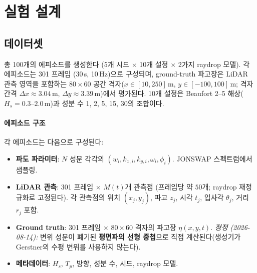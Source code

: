 \documentclass[11pt]{report}
\numberwithin{equation}{chapter}
\numberwithin{figure}{chapter}
\numberwithin{table}{chapter}
\begin{document}
\section{실험 설계}
\label{sec:exp_setup}

\subsection{데이터셋}
\label{sec:dataset}

총 100개의 에피소드를 생성한다
(5개 시드 $\times$ 10개 설정 $\times$ 2가지 raydrop 모델).
각 에피소드는 301 프레임 (30\,s, 10\,Hz)으로 구성되며,
ground-truth 파고장은 LiDAR 관측 영역을 포함하는
$80 \times 60$ 공간 격자($x \in [10, 250]$\,m, $y \in [-100, 100]$\,m;
격자 간격 $\Delta x \approx 3.04$\,m, $\Delta y \approx 3.39$\,m)에서 평가된다.
10개 설정은 Beaufort 2--5 해상($H_s = 0.3$--$2.0$\,m)과
성분 수 1, 2, 5, 15, 30의 조합이다.

\paragraph{에피소드 구조}
각 에피소드는 다음으로 구성된다:
\begin{itemize}
  \item \textbf{파도 파라미터}: $N$ 성분 각각의
        $(w_i, k_{x,i}, k_{y,i}, \omega_i, \phi_i)$. JONSWAP 스펙트럼에서 샘플링.
  \item \textbf{LiDAR 관측}: 301 프레임 $\times$ $M(t)$개 관측점
        (프레임당 약 $50$개; raydrop 재정규화로 고정된다).
        각 관측점의 위치 $(x_j, y_j)$, 파고 $z_j$, 시각 $t_j$,
        입사각 $\theta_j$, 거리 $r_j$ 포함.
  \item \textbf{Ground truth}: 301 프레임 $\times$ $80 \times 60$ 격자의
        파고장 $\eta(x, y, t)$.
        \emph{정정 (2026-08-14):} 변위 성분이 폐기된 \textbf{평면파의 선형 중첩}으로
        직접 계산된다(생성기가 Gerstner의 수평 변위를 사용하지 않는다).
  \item \textbf{메타데이터}: $H_s$, $T_p$, 방향, 성분 수, 시드, raydrop 모델.
\end{itemize}
\end{document}
